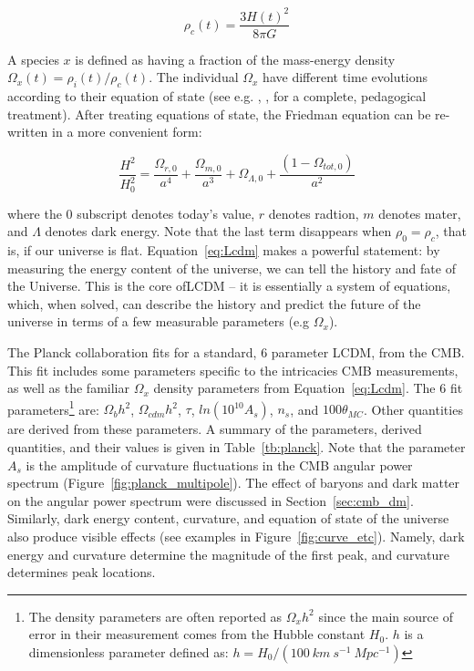 \begin{equation}
\rho_{c}(t) = \frac{ 3 H(t)^{2}}{8 \pi G} 
\end{equation}

A species $x$ is defined as having a fraction of the mass-energy density $\Omega_{x}(t) = \rho_{i}(t) / \rho_{c}(t)$. The individual $\Omega_{x}$ have different time evolutions according to their equation of state (see e.g. \cite{Ryden2006}, \cite{Kolb1990}, for a complete, pedagogical treatment). After treating equations of state, the Friedman equation can be re-written in a more convenient form: 

\begin{equation}
\label{eq:Lcdm}
\frac{H^{2}}{H_{0}^{2}} = \frac{\Omega_{r, 0}}{a^{4}} + \frac{\Omega_{m, 0}}{a^{3}} + \Omega_{\Lambda, 0} + \frac{( 1 - \Omega_{tot,0})}{a^{2}} 
\end{equation}
  
where the $0$ subscript denotes today's value, $r$ denotes radtion, $m$ denotes mater, and $\Lambda$ denotes dark energy. Note that the last term disappears when $\rho_{0} = \rho_{c}$, that is, if our universe is flat. Equation~\ref{eq:Lcdm} makes a powerful statement: by measuring the energy content of the universe, we can tell the history and fate of the Universe. This is the core of\ac{LCDM} -- it is essentially a system of equations, which, when solved, can describe the history and predict the future of the universe in terms of a few measurable parameters (e.g $\Omega_{x}$). 

The Planck collaboration fits for a standard, 6 parameter \ac{LCDM}, from the \ac{CMB}. This fit includes some parameters specific to the intricacies \ac{CMB} measurements, as well as the familiar $\Omega_{x}$ density parameters from Equation~\ref{eq:Lcdm}. The 6 fit parameters\footnote{ The density parameters are often reported as $\Omega_{x}h^{2}$ since the main source of error in their measurement comes from the Hubble constant $H_{0}$. $h$ is a dimensionless parameter defined as: $h = H_{0}/( 100~km~s^{-1}~Mpc^{-1})$} are:  $\Omega_{b}h^{2}$, $\Omega_{cdm}h^{2}$, $\tau$, $ln(10^{10}A_{s})$, $n_{s}$, and $100\theta_{MC}$. Other quantities are derived from these parameters. A summary of the parameters, derived quantities, and their values is given in Table~\ref{tb:planck}. Note that the parameter $A_{s}$ is the amplitude of curvature fluctuations in the \ac{CMB} angular power spectrum (Figure~\ref{fig:planck_multipole}). The effect of baryons and dark matter on the angular power spectrum were discussed in Section~\ref{sec:cmb_dm}. Similarly, dark energy content, curvature, and equation of state of the universe also produce visible effects (see examples in Figure~\ref{fig:curve_etc}). Namely, dark energy and curvature determine the magnitude of the first peak, and curvature determines peak locations.

